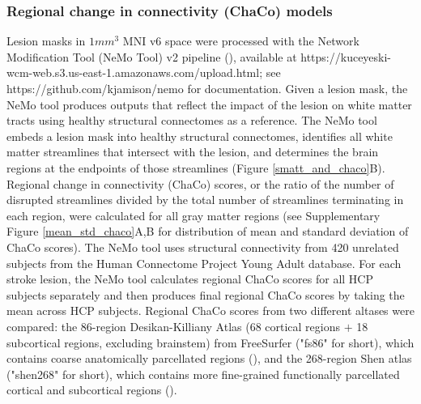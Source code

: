 \documentclass[10pt]{article}
\def\Plus{\texttt{+}}
\begin{document}
\subsubsection*{Regional change in connectivity (ChaCo) models}
Lesion masks in $1mm^3$ MNI v6 space were processed with the Network Modification Tool (NeMo Tool) v2 pipeline (\cite{Kuceyeski2013-nk}), available at https://kuceyeski-wcm-web.s3.us-east-1.amazonaws.com/upload.html; see https://github.com/kjamison/nemo for documentation. Given a lesion mask, the NeMo tool produces outputs that reflect the impact of the lesion on white matter tracts using healthy structural connectomes as a reference. The NeMo tool embeds a lesion mask into healthy structural connectomes, identifies all white matter streamlines that intersect with the lesion, and determines the brain regions at the endpoints of those streamlines (Figure \ref{smatt_and_chaco}B). Regional change in connectivity (ChaCo) scores, or the ratio of the number of disrupted streamlines divided by the total number of streamlines terminating in each region, were calculated for all gray matter regions (see Supplementary Figure \ref{mean_std_chaco}A,B for distribution of mean and standard deviation of ChaCo scores). The NeMo tool uses structural connectivity from 420 unrelated subjects from the Human Connectome Project Young Adult database. For each stroke lesion, the NeMo tool calculates regional ChaCo scores for all HCP subjects separately and then produces final regional ChaCo scores by taking the mean across HCP subjects. Regional ChaCo scores from two different altases were compared: the 86-region Desikan-Killiany Atlas (68 cortical regions $\Plus$ 18 subcortical regions, excluding brainstem) from FreeSurfer ("fs86" for short), which contains coarse anatomically parcellated regions (\cite{Desikan2006-vf,Fischl2002-lb}), and the 268-region Shen atlas ("shen268" for short), which contains more fine-grained functionally parcellated cortical and subcortical regions (\cite{Shen2013-zn}).
\end{document}
